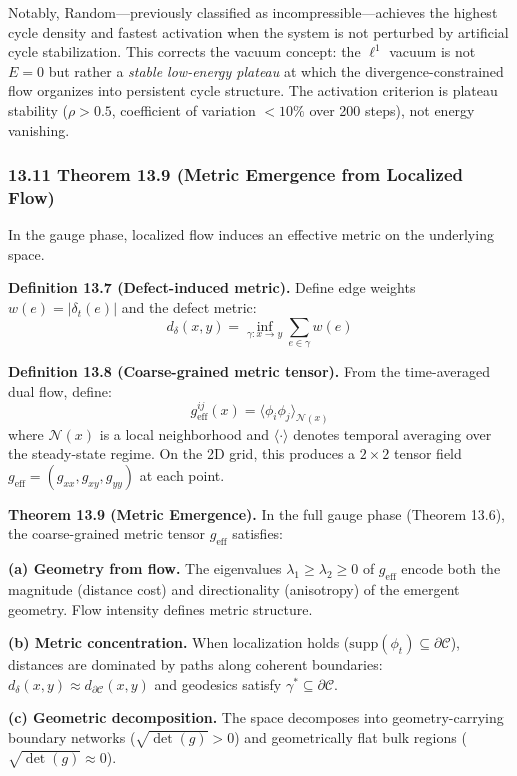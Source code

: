 \documentclass[
]{article}
\begin{document}
Notably, Random---previously classified as incompressible---achieves the
highest cycle density and fastest activation when the system is not
perturbed by artificial cycle stabilization. This corrects the vacuum
concept: the \(\ell^1\) vacuum is not \(E = 0\) but rather a
\emph{stable low-energy plateau} at which the divergence-constrained
flow organizes into persistent cycle structure. The activation criterion
is plateau stability (\(\rho > 0.5\), coefficient of variation
\(< 10\%\) over 200 steps), not energy vanishing.

\subsubsection{13.11 Theorem 13.9 (Metric Emergence from Localized
Flow)}\label{theorem-13.9-metric-emergence-from-localized-flow}

In the gauge phase, localized flow induces an effective metric on the
underlying space.

\textbf{Definition 13.7 (Defect-induced metric).} Define edge weights
\(w(e) = |\delta_t(e)|\) and the defect metric:
\[d_\delta(x,y) = \inf_{\gamma:x \to y} \sum_{e \in \gamma} w(e)\]

\textbf{Definition 13.8 (Coarse-grained metric tensor).} From the
time-averaged dual flow, define:
\[g_{\mathrm{eff}}^{ij}(x) = \langle \phi_i \phi_j \rangle_{\mathcal{N}(x)}\]
where \(\mathcal{N}(x)\) is a local neighborhood and
\(\langle \cdot \rangle\) denotes temporal averaging over the
steady-state regime. On the 2D grid, this produces a \(2 \times 2\)
tensor field \(g_{\mathrm{eff}} = (g_{xx}, g_{xy}, g_{yy})\) at each
point.

\textbf{Theorem 13.9 (Metric Emergence).} In the full gauge phase
(Theorem 13.6), the coarse-grained metric tensor \(g_{\mathrm{eff}}\)
satisfies:

\textbf{(a) Geometry from flow.} The eigenvalues
\(\lambda_1 \geq \lambda_2 \geq 0\) of \(g_{\mathrm{eff}}\) encode both
the magnitude (distance cost) and directionality (anisotropy) of the
emergent geometry. Flow intensity defines metric structure.

\textbf{(b) Metric concentration.} When localization holds
(\(\mathrm{supp}(\phi_t) \subseteq \partial\mathcal{C}\)), distances are
dominated by paths along coherent boundaries:
\(d_\delta(x,y) \approx d_{\partial\mathcal{C}}(x,y)\) and geodesics
satisfy \(\gamma^* \subseteq \partial\mathcal{C}\).

\textbf{(c) Geometric decomposition.} The space decomposes into
geometry-carrying boundary networks (\(\sqrt{\det(g)} > 0\)) and
geometrically flat bulk regions (\(\sqrt{\det(g)} \approx 0\)).
\end{document}
